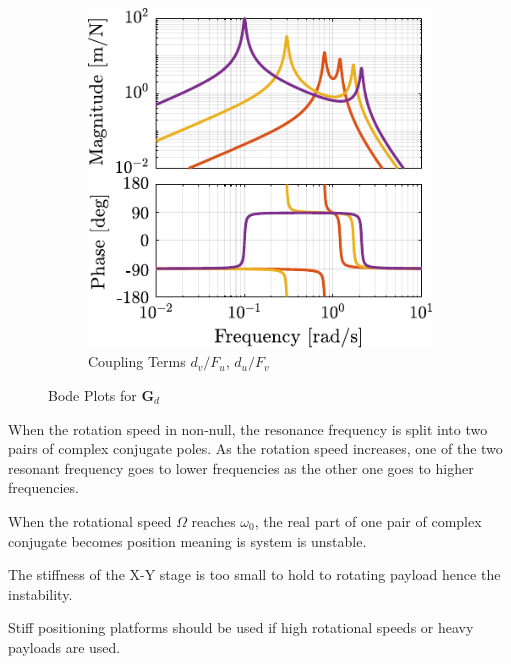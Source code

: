 \documentclass{ISMA_USD2020}
\begin{document}
\begin{figure}[htbp]
\begin{subfigure}[c]{0.45\linewidth}
\includegraphics[width=\linewidth]{figs/plant_compare_rotating_speed_coupling.pdf}
\caption{\label{fig:plant_compare_rotating_speed_coupling} Coupling Terms \(d_v/F_u\), \(d_u/F_v\)}
\end{subfigure}
\caption{\label{fig:plant_compare_rotating_speed}Bode Plots for \(\bm{G}_d\)}
\centering
\end{figure}



When the rotation speed in non-null, the resonance frequency is split into two pairs of complex conjugate poles.
As the rotation speed increases, one of the two resonant frequency goes to lower frequencies as the other one goes to higher frequencies.

When the rotational speed \(\Omega\) reaches \(\omega_0\), the real part of one pair of complex conjugate becomes position meaning is system is unstable.

The stiffness of the X-Y stage is too small to hold to rotating payload hence the instability.

Stiff positioning platforms should be used if high rotational speeds or heavy payloads are used.
\end{document}
